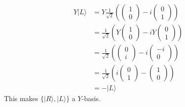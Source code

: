 \documentclass{article}
\begin{document}
  \begin{align*}
      Y|L\rangle &= Y\frac{1}{\sqrt{2}}\left(\begin{pmatrix}1\\0\end{pmatrix}-i\begin{pmatrix}0\\1\end{pmatrix}\right)\\
      &= \frac{1}{\sqrt{2}}\left(Y\begin{pmatrix}1\\0\end{pmatrix} - iY\begin{pmatrix}0\\1\end{pmatrix}\right)\\
      &= \frac{1}{\sqrt{2}}\left(\begin{pmatrix}0\\i\end{pmatrix} - i\begin{pmatrix}-i\\0\end{pmatrix}\right)\\
      &= \frac{1}{\sqrt{2}}\left(i\begin{pmatrix}0\\1\end{pmatrix} - \begin{pmatrix}1\\0\end{pmatrix}\right)\\
      &= -|L\rangle
  \end{align*}
  This makes $\{ |R\rangle, |L\rangle\}$ a $Y$-basis.\\\\
\end{document}
